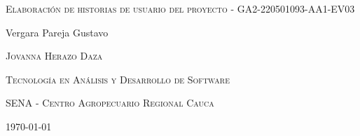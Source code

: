 \documentclass{article}
\author{Gustavo Vergara}
\theoremstyle{mytheoremstyle}
\theoremstyle{mytheoremstyle}
\theoremstyle{myproblemstyle}
\begin{document}
\pgfplotsset{compat=1.18}

\begin{titlepage}
    \centering
    \vspace{2.5cm}
    {\scshape \Large Elaboración de historias de usuario del proyecto - GA2-220501093-AA1-EV03 \par}
    \vspace{5cm}
    \textbf\large\scshape{\par}
         \vspace{0.5cm}
         
    {\Large Vergara Pareja Gustavo\par}
    \vspace{5cm}
    {\scshape\Large Jovanna Herazo Daza\par}
    \vspace{0.3cm}
    {\scshape\Large Tecnología en Análisis y Desarrollo de Software \par}
    \vspace{0.3cm}
    {\scshape\Large SENA - Centro Agropecuario Regional Cauca\par}
    \vspace{0.3cm}
    {\Large \today \par}
    \end{titlepage}
\end{document}
